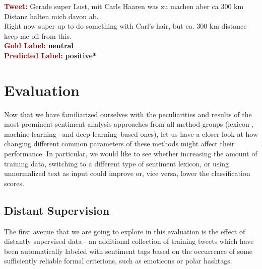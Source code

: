 \begin{example}\label{snt:cgsa:exmp:lba-error}
  \noindent\textup{\bfseries\textcolor{darkred}{Tweet:}} {\upshape
    \colorbox{green!0.5!blue!0.4}{Gerade} \colorbox{green!89}{super} \colorbox{blue!0.3}{Lust}, mit \colorbox{white!2}{Carls} Haaren \colorbox{white!0.6}{was} zu \colorbox{green!1}{machen} \colorbox{green!0.3}{aber} \colorbox{white!2}{ca} 300 \colorbox{white!1}{km}
    \colorbox{white!1}{Distanz} halten \colorbox{blue!0.3}{mich} davon \colorbox{white!1}{ab}.}\\
  \noindent \colorbox{green!0.5!blue!0.4}{Right now} \colorbox{green!89}{super} \colorbox{blue!0.3}{up to} \colorbox{green!1}{do} \colorbox{white!0.6}{something} with \colorbox{white!2}{Carl}'s hair, \colorbox{green!0.3}{but} \colorbox{white!2}{ca.} 300 \colorbox{white!1}{km}
  \colorbox{white!1}{distance} keep \colorbox{blue!0.3}{me} \colorbox{white!1}{off} from this.\\[\exampleSep]
  \noindent\textup{\bfseries\textcolor{darkred}{Gold Label:}}\hspace*{4.3em}\textbf{%
    \upshape\textcolor{black}{neutral}}\\
 \noindent\textup{\bfseries\textcolor{darkred}{Predicted Label:}}\hspace*{2em}\textbf{%
    \upshape\textcolor{green3}{positive*}}
\end{example}


\section{Evaluation}

Now that we have familiarized ourselves with the peculiarities and
results of the most prominent sentiment analysis approaches from all
method groups (lexicon-, machine-learning-- and deep-learning--based
ones), let us have a closer look at how changing different common
parameters of these methods might affect their performance.  In
particular, we would like to see whether increasing the amount of
training data, switching to a different type of sentiment lexicon, or
using unnormalized text as input could improve or, vice versa, lower
the classification scores.

\subsection{Distant Supervision}

The first avenue that we are going to explore in this evaluation is
the effect of distantly supervised data---an additional collection of
training tweets which have been automatically labeled with sentiment
tags based on the occurrence of some sufficiently reliable formal
criterions, such as emoticons or polar hashtags.

